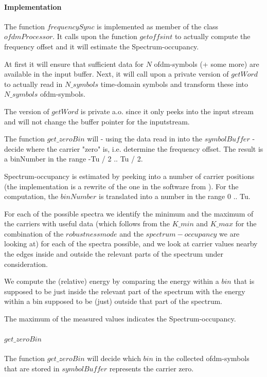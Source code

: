 \documentclass[11pt]{article}
\begin{document}
\paragraph{Implementation}
The function $frequencySync$ is implemented as member of
the class $ofdmProcessor$.
It calls upon the function $getoffsint$ to actually compute the frequency
offset and it will estimate the Spectrum-occupancy.

At first it will ensure that sufficient data for $N$ ofdm-symbols
(+ some more) are
available in the input buffer. Next, it will call upon a private version
of $getWord$ to actually read in $N\_symbols$ time-domain symbols
and transform these into $N\_symbols$ ofdm-symbols.

The version of $getWord$ is private a.o. since it only peeks into
the input stream and will not change the buffer pointer for the inputstream.

The function $get\_zeroBin$ will - using the data read in
into the $symbolBuffer$ - decide where the carrier "zero" is, i.e. determine
the frequency offset. The result is a binNumber in the range -Tu / 2 .. Tu / 2.

Spectrum-occupancy is estimated by peeking into a number
of carrier positions (the implementation is a rewrite of the one in
the software from \cite{Bos}).
For the computation, the $binNumber$ is translated
into a number in the range 0 .. Tu.

For each of the possible spectra we identify the minimum and the
maximum of the carriers with useful data (which follows from the $K\_min$
and $K\_max$ for the combination of the $robustnessmode$ and the
$spectrum-occupancy$ we are looking at) for each
of the spectra possible, and we
look at carrier values nearby the edges inside and outside the 
relevant parts of the spectrum
under consideration.

We compute the (relative) energy by comparing the energy 
within a $bin$ that is supposed to be just inside the relevant
part of the spectrum with the energy 
within a bin supposed to be (just) outside that part of the spectrum.

The maximum of the measured values indicates the Spectrum-occupancy.

\paragraph{$get\_zeroBin$}
The function $get\_zeroBin$ will decide which $bin$ in the collected
ofdm-symbols
that are stored in $symbolBuffer$ represents the carrier zero.
\end{document}
